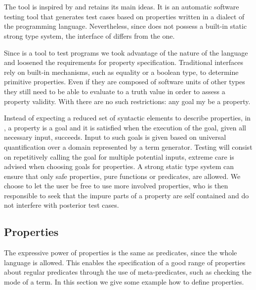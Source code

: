 
\section{\plqc}
\label{sec:plqc}

The \plqc{} tool is inspired by \QuickCheck{} and retains its main
ideas.
%
It is an automatic software testing tool that generates test cases based
on properties written in a dialect of the programming language.
%
Nevertheless, since \Prolog{} does not possess a built-in static strong
type system, the interface of \plqc{} differs from the \Haskell{}
\QuickCheck{} one.



Since \plqc{} is a tool to test \Prolog{} programs we took advantage of
the nature of the language and loosened the requirements for property
specification.
%
Traditional interfaces rely on built-in mechanisms, such as equality or
a boolean type, to determine primitive properties.
%
Even if they are composed of software units of other types they still
need to be able to evaluate to a truth value in order to assess a
property validity.
%
With \Prolog{} there are no such restrictions: any goal my be a property.


Instead of expecting a reduced set of syntactic elements to describe
properties, in \plqc{}, a property is a goal and it is satisfied when
the execution of the goal, given all necessary input, succeeds.
%
Input to such goals is given based on \plqc{} universal quantification
over a domain represented by a term generator.
%
Testing will consist on repetitively calling the goal for multiple
potential inputs, extreme care is advised when choosing goals for
properties.
%
A strong static type system can ensure that only safe properties, pure
functions or predicates, are allowed.
%
We choose to let the user be free to use more involved properties, who
is then responsible to seek that the impure parts of a property are self
contained and do not interfere with posterior test cases.



\subsection{Properties}

The expressive power of properties is the same as \Prolog{} predicates,
since the whole language is allowed.
%
This enables the specification of a good range of properties about
regular predicates through the use of meta-predicates, such as checking
the mode of a term.
%
In this section we give some example how to define properties.


